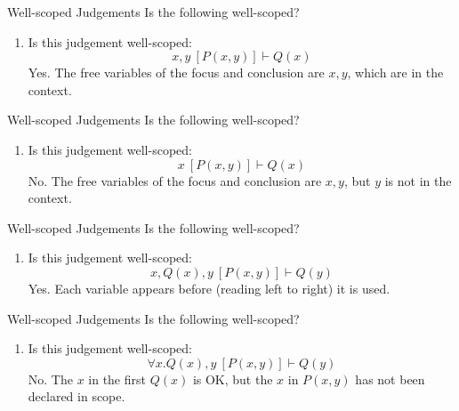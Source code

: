 \documentclass[xetex,aspectratio=169,14pt,hyperref={pdfpagelabels=true,pdflang={en-GB}}]{beamer}
\begin{document}
\begin{frame}
  {Well-scoped Judgements}
  Is the following well-scoped?

  \bigskip

  \begin{enumerate}
  \item Is this judgement well-scoped:
    \begin{displaymath}
      x, y~[P(x,y)] \vdash Q(x)
    \end{displaymath}
    \pause Yes. The free variables of the focus and conclusion are
    $x, y$, which are in the context.

  \end{enumerate}
\end{frame}

\begin{frame}
  {Well-scoped Judgements}
  Is the following well-scoped?

  \bigskip

  \begin{enumerate}
  \item Is this judgement well-scoped:
    \begin{displaymath}
      x~[P(x,y)] \vdash Q(x)
    \end{displaymath}
    \pause No. The free variables of the focus and conclusion are
    $x, y$, but $y$ is not in the context.

  \end{enumerate}
\end{frame}

\begin{frame}
  {Well-scoped Judgements}
  Is the following well-scoped?

  \bigskip

  \begin{enumerate}
  \item Is this judgement well-scoped:
    \begin{displaymath}
      x, Q(x), y~[P(x,y)] \vdash Q(y)
    \end{displaymath}
    \pause Yes. Each variable appears before (reading left to right)
    it is used.
  \end{enumerate}
\end{frame}

\begin{frame}
  {Well-scoped Judgements}
  Is the following well-scoped?

  \bigskip

  \begin{enumerate}
  \item Is this judgement well-scoped:
    \begin{displaymath}
      \forall x. Q(x), y~[P(x,y)] \vdash Q(y)
    \end{displaymath}
    \pause No. The $x$ in the first $Q(x)$ is OK, but the $x$ in
    $P(x,y)$ has not been declared in scope.
  \end{enumerate}
\end{frame}
\end{document}
